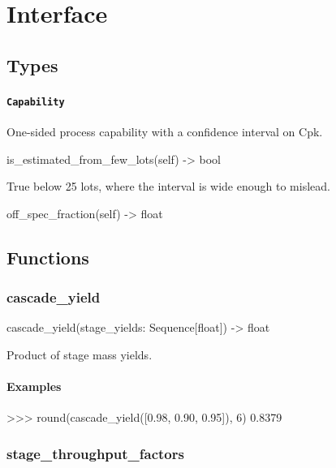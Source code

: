\documentclass[10pt,a4paper,twoside]{report}
\begin{document}
\section{Interface}

\subsection*{Types}

\paragraph{\texttt{Capability}}

One-sided process capability with a confidence interval on Cpk.

\begin{verbatimsmall}
is_estimated_from_few_lots(self) -> bool
\end{verbatimsmall}

True below 25 lots, where the interval is wide enough to mislead.

\begin{verbatimsmall}
off_spec_fraction(self) -> float
\end{verbatimsmall}

\subsection*{Functions}

\subsubsection*{cascade\_yield}

\begin{verbatimsmall}
cascade_yield(stage_yields: Sequence[float]) -> float
\end{verbatimsmall}

Product of stage mass yields.

\paragraph*{Examples}

\begin{doctestblock}
>>> round(cascade_yield([0.98, 0.90, 0.95]), 6)
0.8379
\end{doctestblock}

\subsubsection*{stage\_throughput\_factors}
\end{document}
